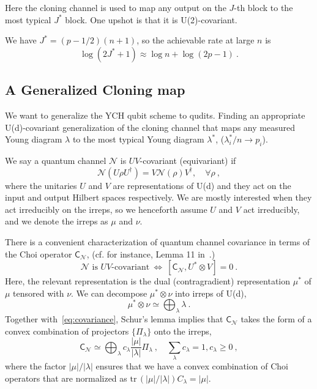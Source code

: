 \documentclass[11pt,letterpaper]{article}
\def\N{\mathcal{N}}
\def\tr{\mathrm{tr}}
\begin{document}
Here the cloning channel is used to map any output on the $J$-th block to the most typical $J^*$ block. One upshot is that it is U(2)-covariant.



We have $J^*=(p-1/2)(n+1)$, so the achievable rate at large $n$ is
\begin{equation}\label{eq:achievable_qubit}
    \log (2J^*+1) \approx \log n + \log (2p-1)\ .
\end{equation}

\subsection{A Generalized Cloning map}

We want to generalize the YCH qubit scheme to qudits. Finding an appropriate U(d)-covariant generalization of the cloning channel that maps any measured Young diagram $\lambda$ to the most typical Young diagram $\lambda^*$, ($\lambda^*_i/n\to p_i$).

We say a quantum channel $\N$ is $UV$-covariant (equivariant) if 
\begin{equation}\label{eq:covariance}
    \N(U\rho U^\dagger) = V\N(\rho)V^\dagger, \quad\forall\rho\ ,
\end{equation}
where the unitaries $U$ and $V$ are representations of U(d) and they act on the input and output Hilbert spaces respectively. We are mostly interested when they act irreducibly on the irreps, so we henceforth assume $U$ and $V$ act irreducibly, and we denote the irreps as $\mu$ and $\nu$.

There is a convenient characterization of quantum channel covariance in terms of the Choi operator $\mathsf{C}_{\N}$, (cf. for instance, Lemma 11 in~\cite{gschwendtner2021programmability}.) 
\begin{equation}
    \text{$\N$ is $UV$-covariant}\ \Longleftrightarrow \ [\mathsf{C}_{\N},U^*\otimes V]=0\ .
\end{equation}
Here, the relevant representation is the dual (contragradient) representation $\mu^*$ of $\mu$ tensored with $\nu$. We can decompose $\mu^*\otimes\nu$ into irreps of U(d),
\begin{equation}\label{eq:decomp}
    \mu^*\otimes\nu \simeq \bigoplus_\lambda \lambda\ .
\end{equation}
Together with~\eqref{eq:covariance}, Schur's lemma implies that $\mathsf{C}_\N$ takes the form of a convex combination of projectors $\{\Pi_\lambda\}$ onto the irreps,
\begin{equation}\label{eq:covChoi}
    \mathsf{C}_\N\simeq \bigoplus_\lambda c_\lambda \frac{|\mu|}{|\lambda|} \Pi_\lambda\ , \quad \sum_\lambda c_\lambda =1, c_\lambda\ge 0\ ,
\end{equation}
where the factor $|\mu|/|\lambda|$ ensures that we have a convex combination of Choi operators that are normalized as $\tr\, (|\mu|/|\lambda|)C_\lambda=|\mu|$.
\end{document}
